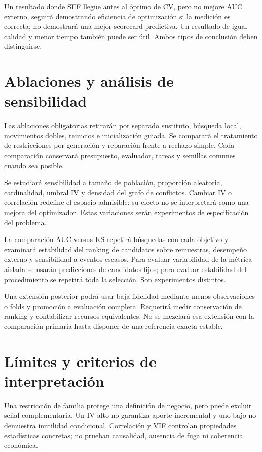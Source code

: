 \documentclass[11pt,letterpaper]{article}
\begin{document}
Un resultado donde SEF llegue antes al óptimo de CV, pero no mejore AUC externo, seguirá demostrando eficiencia de optimización si la medición es correcta; no demostrará una mejor scorecard predictiva. Un resultado de igual calidad y menor tiempo también puede ser útil. Ambos tipos de conclusión deben distinguirse.

\section{Ablaciones y análisis de sensibilidad}\label{sec:12}

Las ablaciones obligatorias retirarán por separado sustituto, búsqueda local, movimientos dobles, reinicios e inicialización guiada. Se comparará el tratamiento de restricciones por generación y reparación frente a rechazo simple. Cada comparación conservará presupuesto, evaluador, tareas y semillas comunes cuando sea posible.

Se estudiará sensibilidad a tamaño de población, proporción aleatoria, cardinalidad, umbral IV y densidad del grafo de conflictos. Cambiar IV o correlación redefine el espacio admisible: su efecto no se interpretará como una mejora del optimizador. Estas variaciones serán experimentos de especificación del problema.

La comparación AUC versus KS repetirá búsquedas con cada objetivo y examinará estabilidad del ranking de candidatos sobre remuestras, desempeño externo y sensibilidad a eventos escasos. Para evaluar variabilidad de la métrica aislada se usarán predicciones de candidatos fijos; para evaluar estabilidad del procedimiento se repetirá toda la selección. Son experimentos distintos.

Una extensión posterior podrá usar baja fidelidad mediante menos observaciones o folds y promoción a evaluación completa. Requerirá medir conservación de ranking y contabilizar recursos equivalentes. No se mezclará esa extensión con la comparación primaria hasta disponer de una referencia exacta estable.

\section{Límites y criterios de interpretación}\label{sec:13}

Una restricción de familia protege una definición de negocio, pero puede excluir señal complementaria. Un IV alto no garantiza aporte incremental y uno bajo no demuestra inutilidad condicional. Correlación y VIF controlan propiedades estadísticas concretas; no prueban causalidad, ausencia de fuga ni coherencia económica.
\end{document}
